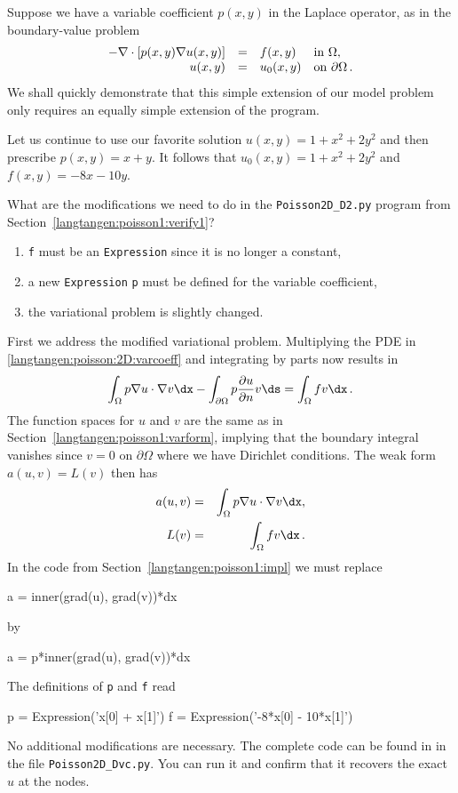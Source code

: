 Suppose we have a variable coefficient $p(x,y)$ in the Laplace operator,
as in the boundary-value problem
\begin{equation} \label{langtangen:poisson:2D:varcoeff}
  \begin{array}{rcll}
    - \nabla\cdot \left\lbrack
p(x,y)\nabla u(x,y)\right\rbrack &=& f(x,y) &\mbox{in } \Omega, \\
    u(x,y) &=& u_0(x,y) &\mbox{on } \partial\Omega\thinspace .
  \end{array}
\end{equation}
We shall quickly demonstrate that this simple extension of our model
problem only requires an equally simple extension of the \fenics{} program.

Let us continue to use our favorite solution $u(x,y)=1+x^2+2y^2$ and 
then prescribe $p(x,y)=x+y$. It follows that
$u_0(x,y) = 1 + x^2 + 2y^2$ and $f(x,y)=-8x-10y$.

What are the modifications we need to do in the {\fontsize{10pt}{10pt}\verb!Poisson2D_D2.py!} program
from Section~\ref{langtangen:poisson1:verify1}?
\begin{enumerate}
\item {\fontsize{10pt}{10pt}\texttt{f}} must be an {\fontsize{10pt}{10pt}\texttt{Expression}} since it is no longer a constant,
\item a new {\fontsize{10pt}{10pt}\texttt{Expression}} {\fontsize{10pt}{10pt}\texttt{p}} must be defined for the variable coefficient,
\item the variational problem is slightly changed.
\end{enumerate}
First we address the modified variational problem. Multiplying
the PDE in \eqref{langtangen:poisson:2D:varcoeff} and 
integrating by parts now results
in
\[ \int_\Omega p\nabla u\cdot\nabla v\dx - 
\int_{\partial\Omega} p{\partial u\over
\partial n}v\ds = \int_\Omega fv\dx\langtangenep\]
The function spaces for $u$ and $v$ are the same as in
Section~\ref{langtangen:poisson1:varform}, implying that the boundary integral
vanishes since $v=0$ on $\partial\Omega$ where we have Dirichlet conditions.
The weak form $a(u,v)=L(v)$ then has
\begin{eqnarray}
a(u,v) &=& \int_\Omega p\nabla u\cdot\nabla v\dx,\\
L(v) &=& \int_\Omega fv\dx\langtangenep
\end{eqnarray}
In the code from Section~\ref{langtangen:poisson1:impl} we must replace
\begin{python}
a = inner(grad(u), grad(v))*dx
\end{python}
by
\begin{python}
a = p*inner(grad(u), grad(v))*dx
\end{python}
The definitions of {\fontsize{10pt}{10pt}\texttt{p}} and {\fontsize{10pt}{10pt}\texttt{f}} read
\begin{python}
p = Expression('x[0] + x[1]')
f = Expression('-8*x[0] - 10*x[1]')
\end{python}
No additional modifications are necessary. The complete code can be
found in in the file {\fontsize{10pt}{10pt}\verb!Poisson2D_Dvc.py!}. You can run it and confirm
that it recovers the exact $u$ at the nodes.

